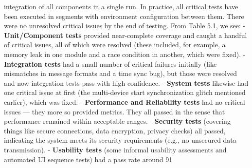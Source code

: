 integration of all components in a single run. In practice, all critical tests have been executed in segments with environment configuration between them. There were no unresolved critical issues by the end of testing. From Table 5.1, we see: - \textbf{Unit/Component tests} provided near-complete coverage and caught a handful of critical issues, all of which were resolved (these included, for example, a memory leak in one module and a race condition in another, which were fixed). - \textbf{Integration tests} had a small number of critical failures initially (like mismatches in message formats and a time sync bug), but those were resolved and now integration tests pass with high confidence. - \textbf{System tests} likewise had one critical issue at first (the multi-device start synchronization glitch mentioned earlier), which was fixed. - \textbf{Performance and Reliability tests} had no critical issues --- they more so provided metrics. They all passed in the sense that performance remained within acceptable ranges. - \textbf{Security tests} (covering things like secure connections, data encryption, privacy checks) all passed, indicating the system meets its security requirements (e.g., no unsecured data transmission). - \textbf{Usability tests} (some informal usability assessments and automated UI sequence tests) had a pass rate around 91%
